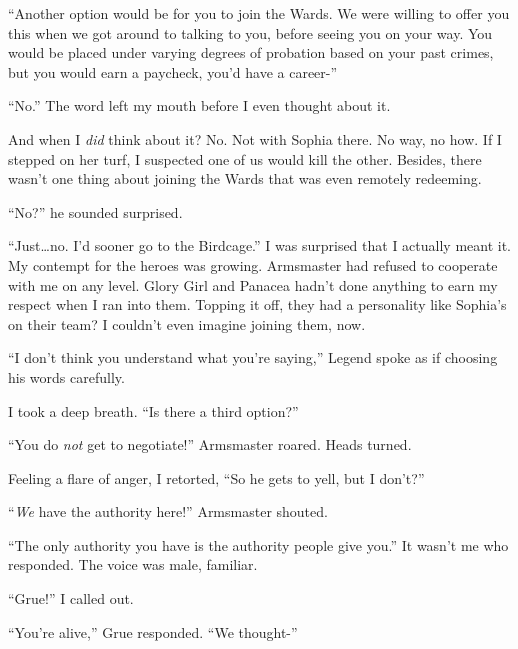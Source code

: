``Another option would be for you to join the Wards.  We were willing to offer you this when we got around to talking to you, before seeing you on your way.  You would be placed under varying degrees of probation based on your past crimes, but you would earn a paycheck, you'd have a career-''



``No.'' The word left my mouth before I even thought about it.



And when I \emph{did} think about it?  No.  Not with Sophia there.  No way, no how.  If I stepped on her turf, I suspected one of us would kill the other.  Besides, there wasn't one thing about joining the Wards that was even remotely redeeming.



``No?'' he sounded surprised.



``Just\ldots no.  I'd sooner go to the Birdcage.''  I was surprised that I actually meant it.  My contempt for the heroes was growing.  Armsmaster had refused to cooperate with me on any level.  Glory Girl and Panacea hadn't done anything to earn my respect when I ran into them.  Topping it off, they had a personality like Sophia's on their team?  I couldn't even imagine joining them, now.



``I don't think you understand what you're saying,'' Legend spoke as if choosing his words carefully.



I took a deep breath.  ``Is there a third option?''



``You do \emph{not} get to negotiate!'' Armsmaster roared.  Heads turned.



Feeling a flare of anger, I retorted, ``So he gets to yell, but I don't?''



``\emph{We} have the authority here!'' Armsmaster shouted.



``The only authority you have is the authority people give you.''  It wasn't me who responded.  The voice was male, familiar.



``Grue!'' I called out.



``You're alive,'' Grue responded.  ``We thought-''



